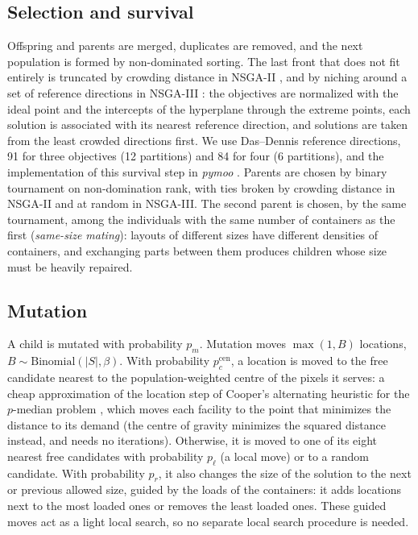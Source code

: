 \subsection{Selection and survival}
Offspring and parents are merged, duplicates are removed, and the next population is formed by non-dominated sorting. The last front that does not fit entirely is truncated by crowding distance in NSGA-II \cite{deb2002fast}, and by niching around a set of reference directions in NSGA-III \cite{deb2013evolutionary}: the objectives are normalized with the ideal point and the intercepts of the hyperplane through the extreme points, each solution is associated with its nearest reference direction, and solutions are taken from the least crowded directions first. We use Das--Dennis reference directions, 91 for three objectives (12 partitions) and 84 for four (6 partitions), and the implementation of this survival step in \textit{pymoo} \cite{blank2020pymoo}. Parents are chosen by binary tournament on non-domination rank, with ties broken by crowding distance in NSGA-II and at random in NSGA-III. The second parent is chosen, by the same tournament, among the individuals with the same number of containers as the first (\emph{same-size mating}): layouts of different sizes have different densities of containers, and exchanging parts between them produces children whose size must be heavily repaired.

\subsection{Mutation}
\label{sec:mutation}
A child is mutated with probability $p_m$. Mutation moves $\max(1, B)$ locations, $B \sim \mathrm{Binomial}(|S|, \beta)$. With probability $p_c^{\mathrm{cen}}$, a location is moved to the free candidate nearest to the population-weighted centre of the pixels it serves: a cheap approximation of the location step of Cooper's alternating heuristic for the $p$-median problem \cite{cooper1964heuristic}, which moves each facility to the point that minimizes the distance to its demand (the centre of gravity minimizes the squared distance instead, and needs no iterations). Otherwise, it is moved to one of its eight nearest free candidates with probability $p_\ell$ (a local move) or to a random candidate. With probability $p_r$, it also changes the size of the solution to the next or previous allowed size, guided by the loads of the containers: it adds locations next to the most loaded ones or removes the least loaded ones. These guided moves act as a light local search, so no separate local search procedure is needed.

